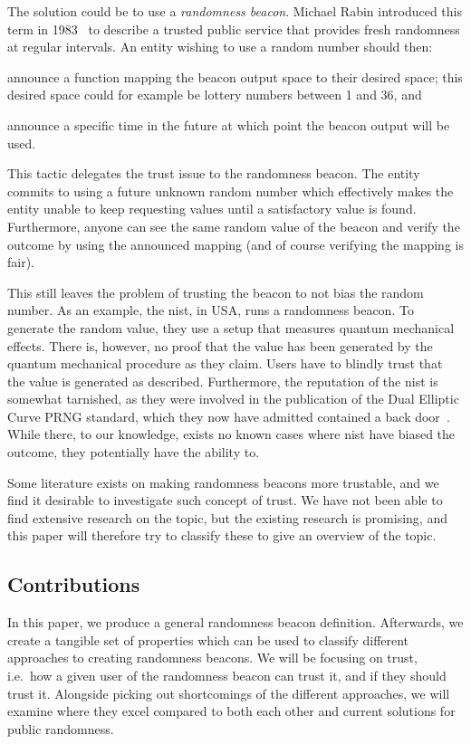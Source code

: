 The solution could be to use a \emph{randomness beacon}.
Michael Rabin introduced this term in 1983~\cite{rabin1983transaction} to describe a trusted public service that provides fresh randomness at regular intervals.
An entity wishing to use a random number should then:
\begin{eromanate*}
    \item announce a function mapping the beacon output space to their desired space; this desired space could for example be lottery numbers between 1 and 36, and
    \item announce a specific time in the future at which point the beacon output will be used.
\end{eromanate*}
This tactic delegates the trust issue to the randomness beacon.
The entity commits to using a future unknown random number which effectively makes the entity unable to keep requesting values until a satisfactory value is found.
Furthermore, anyone can see the same random value of the beacon and verify the outcome by using the announced mapping (and of course verifying the mapping is fair).

This still leaves the problem of trusting the beacon to not bias the random number.
As an example, the \gls{nist}, in USA, runs a randomness beacon.
To generate the random value, they use a setup that measures quantum mechanical effects.
There is, however, no proof that the value has been generated by the quantum mechanical procedure as they claim.
Users have to blindly trust that the value is generated as described.
Furthermore, the reputation of the \gls{nist} is somewhat tarnished, as they were involved in the publication of the Dual Elliptic Curve PRNG standard, which they now have admitted contained a back door~\cite{nist2014backdoor}.
While there, to our knowledge, exists no known cases where \gls{nist} have biased the outcome, they potentially have the ability to.

Some literature exists on making randomness beacons more trustable, and we find it desirable to investigate such concept of trust.
We have not been able to find extensive research on the topic, but the existing research is promising, and this paper will therefore try to classify these to give an overview of the topic.

\subsection*{Contributions}\label{subsec:contributions}
In this paper, we produce a general randomness beacon definition. Afterwards, we create a tangible set of properties which can be used to classify different approaches to creating randomness beacons.
We will be focusing on trust, i.e.\ how a given user of the randomness beacon can trust it, and if they should trust it.
Alongside picking out shortcomings of the different approaches, we will examine where they excel compared to both each other and current solutions for public randomness.

